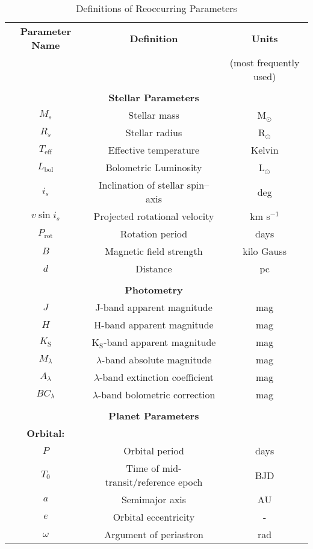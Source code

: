 \begin{table*}
\caption{Definitions of Reoccurring Parameters}
\label{table:paramdefs}
\begin{tabular}{ccc}
  \hline
  \hline
  \textbf{Parameter Name} & \textbf{Definition} & \textbf{Units} \\
  & & (most frequently used) \\
  \hline
  && \\
  & \textbf{Stellar Parameters} & \\
  \hline
  $M_s$ & Stellar mass & M$_{\odot}$ \\
  $R_s$ & Stellar radius & R$_{\odot}$ \\
  $T_{\text{eff}}$ & Effective temperature & Kelvin \\
  $L_{\text{bol}}$ & Bolometric Luminosity & L$_{\odot}$ \\
  $i_s$ & Inclination of stellar spin--axis & deg \\
  $v\sin{i_s}$ & Projected rotational velocity & km s$^{-1}$ \\
  $P_{\text{rot}}$ & Rotation period & days \\
  $B$ & Magnetic field strength & kilo Gauss \\
  $d$ & Distance & pc \\
  \hline
  && \\
  & \textbf{Photometry} & \\
  \hline
  $J$ & J-band apparent magnitude & mag \\
  $H$ & H-band apparent magnitude & mag \\
  $K_{\text{S}}$ & K$_{\text{S}}$-band apparent magnitude & mag \\
  $M_{\lambda}$ & $\lambda$-band absolute magnitude & mag \\
  $A_{\lambda}$ & $\lambda$-band extinction coefficient & mag \\
  $BC_{\lambda}$ & $\lambda$-band bolometric correction & mag \\
  \hline
  && \\
  & \textbf{Planet Parameters} & \\
  \hline
  \textbf{Orbital:} & & \\
  $P$ & Orbital period & days \\
  $T_0$ & Time of mid-transit/reference epoch & BJD \\
  $a$ & Semimajor axis & AU \\
  $e$ & Orbital eccentricity & - \\
  $\omega$ & Argument of periastron & rad \\

\end{tabular}
\end{table*}
